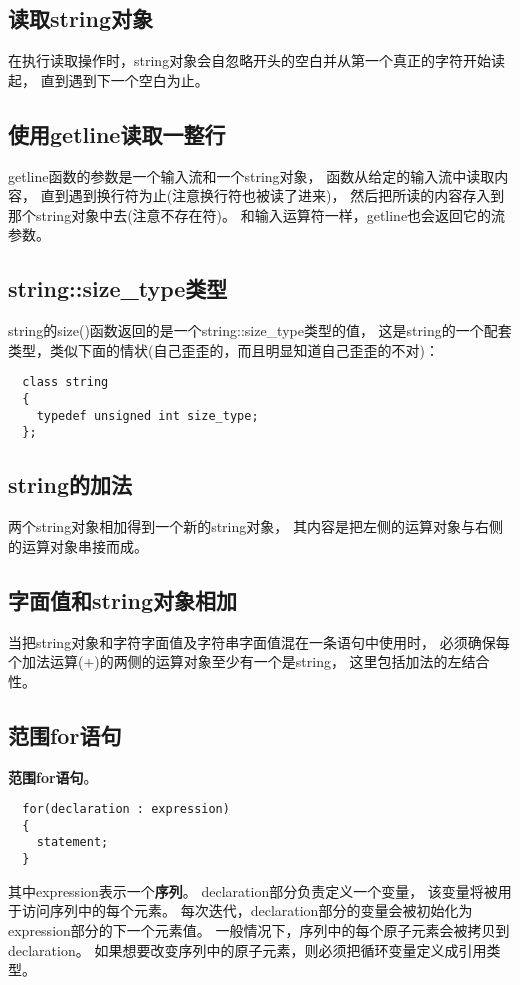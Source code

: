 \subsection{读取string对象}
在执行读取操作时，string对象会自忽略开头的空白并从第一个真正的字符开始读起，%
直到遇到下一个空白为止。%
\subsection{使用getline读取一整行}
getline函数的参数是一个输入流和一个string对象，%
函数从给定的输入流中读取内容，%
直到遇到换行符为止(注意换行符也被读了进来)，%
然后把所读的内容存入到那个string对象中去(注意不存在符)。%
和输入运算符一样，getline也会返回它的流参数。%
\subsection{string::size\_type类型}
string的size()函数返回的是一个string::size\_type类型的值，%
这是string的一个配套类型，类似下面的情状(自己歪歪的，而且明显知道自己歪歪的不对)：%
\begin{lstlisting}
  class string
  {
    typedef unsigned int size_type;
  };
\end{lstlisting}
\subsection{string的加法}
两个string对象相加得到一个新的string对象，%
其内容是把左侧的运算对象与右侧的运算对象串接而成。%
\subsection{字面值和string对象相加}
当把string对象和字符字面值及字符串字面值混在一条语句中使用时，%
必须确保每个加法运算($+$)的两侧的运算对象至少有一个是string，%
这里包括加法的左结合性。
\subsection{范围for语句}
{\color{red}{如果想对string对象中的每个字符做点儿什么操作，%
    目前最好的办法就是使用}}{\bfseries{范围for语句}}。%
{\color{seagreen}{这种语句遍历给定序列中的每个元素并对序列中的每个值执行某种操作。}}
\begin{lstlisting}
  for(declaration : expression)
  {
    statement;
  }
\end{lstlisting}
其中expression表示一个{\bfseries{序列}}。%
declaration部分负责定义一个变量，%
该变量将被用于访问序列中的每个元素。%
每次迭代，declaration部分的变量会被初始化为expression部分的下一个元素值。%
一般情况下，序列中的每个原子元素会被拷贝到declaration。%
如果想要改变序列中的原子元素，则必须把循环变量定义成引用类型。%
